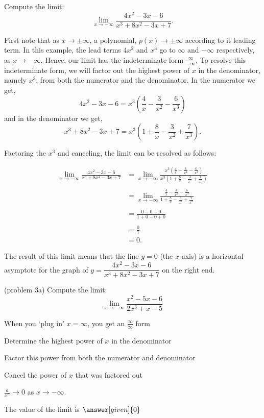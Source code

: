 \documentclass{ximera}
\begin{document}
\begin{example}[example 3]
Compute the limit:
\[
\lim_{x \to -\infty} \frac{4x^2 - 3x - 6}{x^3 +8x^2 -3x + 7}.
\]


First note that as $x\to \pm \infty$, a polynomial, $p(x) \to \pm \infty$ according to it leading term.
In this example, the lead terms $4x^2$ and $x^3$  go to $\infty$ and $-\infty$ respectively, as $x \to -\infty$. 
Hence, our limit has the indeterminate form
$\frac{\infty}{-\infty}$.
To resolve this indeterminate form, we will factor out 
the highest power of $x$ in the denominator, namely $x^3$, from both the numerator and the denominator.  
In the numerator we get, 
\[4x^2 - 3x - 6 = x^3(\frac{4}{x} - \frac{3}{x^2} - \frac{6}{x^3})\]
and in the denominator we get,
\[x^3 +8x^2 -3x + 7 = x^3(1 +  \frac{8}{x} - \frac{3}{x^2} + \frac{7}{x^3}).\]

Factoring the $x^3$ and canceling, the limit can be resolved as follows:

\begin{align*}
\lim_{x \to -\infty}\frac{4x^2 - 3x - 6}{x^3 +8x^2 -3x + 7} &= 
\lim_{x \to -\infty} \frac{x^3(\frac{4}{x}-\frac{3}{x^2} -\frac{6}{x^3})}
{x^3(1 + \frac{8}{x}-\frac{3}{x^2}+\frac{7}{x^3})} \\ \\
&=\lim_{x \to -\infty} \frac{\frac{4}{x}-\frac{3}{x^2} -\frac{6}{x^3}}{1 + \frac{8}{x}-\frac{3}{x^2}+\frac{7}{x^3}} \\ \\
&=\frac{0 - 0 - 0}{1 +0- 0 + 0} \\ \\
&= \frac01 \\
&= 0.
\end{align*}

The result of this limit means that the line $y = 0$ (the $x$-axis) is a horizontal asymptote
for the graph of $y = \dfrac{4x^2 - 3x - 6}{x^3 +8x^2 -3x + 7}$ on the right end.
\end{example}


\begin{problem}(problem 3a)
  Compute the limit:
  \[
  \lim_{x \to -\infty} \frac{x^2 - 5x - 6}{2x^3 + x -5}
  \]
  
    \begin{hint}
      When you `plug in' $x = \infty$, you get an $\frac{\infty}{\infty}$ form
    \end{hint}
    \begin{hint}
      Determine the highest power of $x$ in the denominator
    \end{hint}
    \begin{hint}
      Factor this power from both the numerator and denominator
    \end{hint}
    \begin{hint}
      Cancel the power of $x$ that was factored out
    \end{hint}
    \begin{hint}
      $\frac{a}{x^n} \to 0$ as $x \to -\infty$.
    \end{hint}
		The value of the limit is
		 $\answer[given]{0}$
		
\end{problem}
\end{document}
